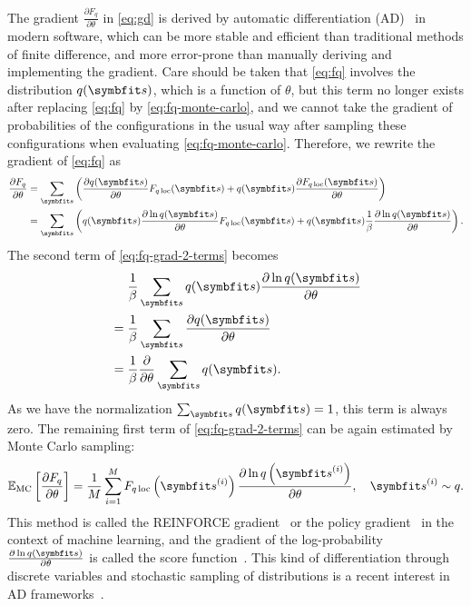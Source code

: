 The gradient $\frac{\partial F_q}{\partial \theta}$ in \cref{eq:gd} is derived by automatic differentiation (AD)~\cite{baydin2018automatic} in modern software, which can be more stable and efficient than traditional methods of finite difference, and more error-prone than manually deriving and implementing the gradient. Care should be taken that \cref{eq:fq} involves the distribution $q(\vs)$, which is a function of $\theta$, but this term no longer exists after replacing \cref{eq:fq} by \cref{eq:fq-monte-carlo}, and we cannot take the gradient of probabilities of the configurations in the usual way after sampling these configurations when evaluating \cref{eq:fq-monte-carlo}. Therefore, we rewrite the gradient of \cref{eq:fq} as
\begin{align}
\frac{\partial F_q}{\partial \theta}
&= \sum_\vs \left( \frac{\partial q(\vs)}{\partial \theta} F_{q\,\text{loc}}(\vs) + q(\vs) \frac{\partial F_{q\,\text{loc}}(\vs)}{\partial \theta} \right) \\
&= \sum_\vs \left( q(\vs) \frac{\partial \ln q(\vs)}{\partial \theta} F_{q\,\text{loc}}(\vs) + q(\vs) \frac{1}{\beta} \frac{\partial \ln q(\vs)}{\partial \theta} \right).
\label{eq:fq-grad-2-terms}
\end{align}
The second term of \cref{eq:fq-grad-2-terms} becomes
\begin{align}
&\phantom{{}={}}\frac{1}{\beta} \sum_\vs q(\vs) \frac{\partial \ln q(\vs)}{\partial \theta} \\
&= \frac{1}{\beta} \sum_\vs \frac{\partial q(\vs)}{\partial \theta} \\
&= \frac{1}{\beta} \frac{\partial}{\partial \theta} \sum_\vs q(\vs).
\end{align}
As we have the normalization $\sum_\vs q(\vs) = 1$, this term is always zero. The remaining first term of \cref{eq:fq-grad-2-terms} can be again estimated by Monte Carlo sampling:
\begin{equation}
\bbE_\text{MC}\left[ \frac{\partial F_q}{\partial \theta} \right]
= \frac{1}{M} \sum_{i = 1}^M F_{q\,\text{loc}}\left( \vs^{(i)} \right) \frac{\partial \ln q\left( \vs^{(i)} \right)}{\partial \theta}, \quad
\vs^{(i)} \sim q.
\label{eq:fq-grad}
\end{equation}
This method is called the REINFORCE gradient~\cite{williams1992simple} or the policy gradient~\cite{sutton1999policy} in the context of machine learning, and the gradient of the log-probability $\frac{\partial \ln q(\vs)}{\partial \theta}$ is called the score function~\cite{fisher1935detection, hyvarinen2005estimation, mohamed2020monte}. This kind of differentiation through discrete variables and stochastic sampling of distributions is a recent interest in AD frameworks~\cite{krieken2021storchastic, arya2022automatic, catumba2023stochastic}.

